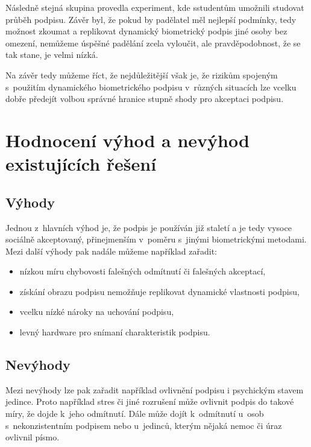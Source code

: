 Následně stejná skupina provedla experiment, kde sstudentům umožnili studovat průběh podpisu.
Závěr byl, že pokud by padělatel měl nejlepší podmínky, tedy možnost zkoumat a replikovat dynamický biometrický podpis jiné osoby bez omezení, 
nemůžeme úspěšné padělání zcela vyloučit, ale pravděpodobnost, že se tak stane, je velmi nízká.~\cite{8585636} %

Na závěr tedy můžeme říct, že nejdůležitější však je, že rizikům spojeným s~použitím dynamického biometrického podpisu v~různých situacích lze vcelku dobře 
předejít volbou správné hranice stupně shody pro akceptaci podpisu.~\cite{8585636} %

\section{Hodnocení výhod a nevýhod existujících řešení}
\subsection*{Výhody}
Jednou z~hlavních výhod je, že podpis je používán již staletí a je tedy vysoce sociálně akceptovaný, přinejmenším v~poměru s~jinými biometrickými metodami.
Mezi další výhody pak nadále můžeme například zařadit:

\begin{itemize}
  \item nízkou míru chybovosti falešných odmítnutí či falešných akceptací,
  \item získání obrazu podpisu nemožňuje replikovat dynamické vlastnosti podpisu,
  \item vcelku nízké nároky na uchování podpisu,
  \item levný hardware pro snímaní charakteristik podpisu.
\end{itemize}

\subsection*{Nevýhody}
Mezi nevýhody lze pak zařadit například ovlivnění podpisu i psychickým stavem jedince.
Proto například stres či jiné rozrušení může ovlivnit podpis do takové míry, že dojde k~jeho odmítnutí.
Dále může dojít k~odmítnutí u~osob s~nekonzistentním podpisem nebo u~jedinců, kterým nějaká nemoc či úraz ovlivnil písmo.

